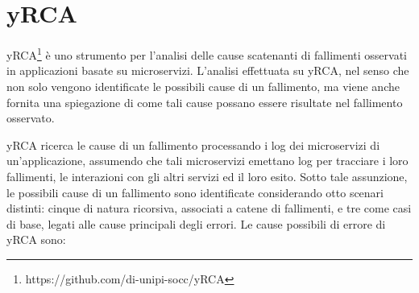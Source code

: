 \section{yRCA}
yRCA\footnote{https://github.com/di-unipi-socc/yRCA} è uno strumento per l'analisi delle cause scatenanti di fallimenti osservati in applicazioni basate su microservizi. L'analisi effettuata su yRCA, nel senso che non solo vengono identificate le possibili cause di un fallimento, ma viene anche fornita una spiegazione di come tali cause possano essere risultate nel fallimento osservato.

yRCA ricerca le cause di un fallimento processando i log dei microservizi di un'applicazione, assumendo che tali microservizi emettano log per tracciare i loro fallimenti, le interazioni con gli altri servizi ed il loro esito. Sotto tale assunzione, le possibili cause di un fallimento sono identificate considerando otto scenari distinti: cinque di natura ricorsiva, associati a catene di fallimenti, e tre come casi di base, legati alle cause principali degli errori. Le cause possibili di errore di yRCA sono:

